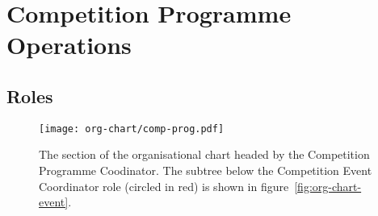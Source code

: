 \chapter{Competition Programme Operations}

\section{Roles}
\begin{landscape}
  \begin{figure}
    \begin{center}
      \texttt{[image: org-chart/comp-prog.pdf]}
    \end{center}
    \caption{\label{fig:org-chart-prog}The section of the organisational chart headed by the Competition Programme Coodinator.  The subtree below the Competition Event Coordinator role (circled in red) is shown in figure~\ref{fig:org-chart-event}.}
  \end{figure}
\end{landscape}
